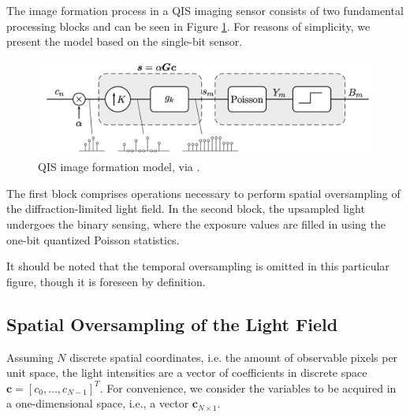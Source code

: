 \label{chapter:imform}


The image formation process in a QIS imaging sensor consists of two fundamental processing blocks and can be seen in Figure \ref{fig:qismodel}. For reasons of simplicity, we present the model based on the single-bit sensor.

\begin{figure}[h]
  \centering
  \includegraphics[width=\linewidth]{imgs/qis/qis-model.png}
  \caption{QIS image formation model, via \cite{s16111961}.}
  \label{fig:qismodel}
\end{figure}

The first block comprises operations necessary to perform spatial oversampling of the diffraction-limited light field. In the second block, the upsampled light undergoes the binary sensing, where the exposure values are filled in using the one-bit quantized Poisson statistics.

It should be noted that the temporal oversampling is omitted in this particular figure, though it is foreseen by definition.

\subsection{Spatial Oversampling of the Light Field}

Assuming $N$ discrete spatial coordinates, i.e. the amount of observable pixels per unit space, the light intensities are a vector of coefficients in discrete space $\boldsymbol{c}=\left[c_{0}, \ldots, c_{N-1}\right]^{T}$. For convenience, we consider the variables to be acquired in a one-dimensional space, i.e., a vector $\boldsymbol{c}_{N \times 1}$. 

